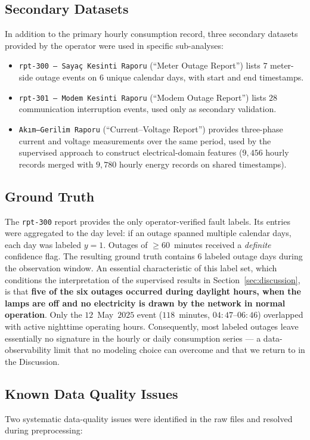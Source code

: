 \documentclass{article}
\begin{document}
\subsection{Secondary Datasets}
In addition to the primary hourly consumption record, three secondary datasets provided by the operator were used in specific sub-analyses:

\begin{itemize}[leftmargin=1.5em,itemsep=1pt]
  \item \texttt{rpt-300 --- Sayaç Kesinti Raporu} (``Meter Outage Report'') lists $7$ meter-side outage events on $6$ unique calendar days, with start and end timestamps.
  \item \texttt{rpt-301 --- Modem Kesinti Raporu} (``Modem Outage Report'') lists $28$ communication interruption events, used only as secondary validation.
  \item \texttt{Ak{\i}m--Gerilim Raporu} (``Current--Voltage Report'') provides three-phase current and voltage measurements over the same period, used by the supervised approach to construct electrical-domain features ($9{,}456$ hourly records merged with $9{,}780$ hourly energy records on shared timestamps).
\end{itemize}

\subsection{Ground Truth}
\label{subsec:groundtruth}
The \texttt{rpt-300} report provides the only operator-verified fault labels. Its entries were aggregated to the day level: if an outage spanned multiple calendar days, each day was labeled $y=1$. Outages of $\geq 60$~minutes received a \emph{definite} confidence flag. The resulting ground truth contains $6$ labeled outage days during the observation window. An essential characteristic of this label set, which conditions the interpretation of the supervised results in Section~\ref{sec:discussion}, is that \textbf{five of the six outages occurred during daylight hours, when the lamps are off and no electricity is drawn by the network in normal operation}. Only the $12$~May~$2025$ event ($118$~minutes, $04{:}47$--$06{:}46$) overlapped with active nighttime operating hours. Consequently, most labeled outages leave essentially no signature in the hourly or daily consumption series --- a data-observability limit that no modeling choice can overcome and that we return to in the Discussion.

\subsection{Known Data Quality Issues}
\label{subsec:quality}
Two systematic data-quality issues were identified in the raw files and resolved during preprocessing:
\end{document}
